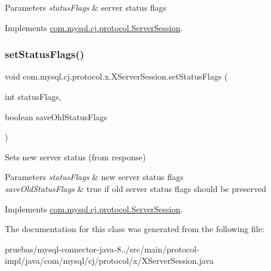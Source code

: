 \begin{DoxyParams}{Parameters}
{\em status\+Flags} & server status flags \\
\hline
\end{DoxyParams}


Implements \mbox{\hyperlink{interfacecom_1_1mysql_1_1cj_1_1protocol_1_1_server_session_a855cbd715a8c33299d062a72fd75d8f4}{com.\+mysql.\+cj.\+protocol.\+Server\+Session}}.

\mbox{\label{classcom_1_1mysql_1_1cj_1_1protocol_1_1x_1_1_x_server_session_a6b21c9c5c8446643ae85e58c3fe97af8}} 
\subsubsection{\texorpdfstring{set\+Status\+Flags()}{setStatusFlags()}\hspace{0.1cm}{\footnotesize\ttfamily [2/2]}}
{\footnotesize\ttfamily void com.\+mysql.\+cj.\+protocol.\+x.\+X\+Server\+Session.\+set\+Status\+Flags (\begin{DoxyParamCaption}\item[{int}]{status\+Flags,  }\item[{boolean}]{save\+Old\+Status\+Flags }\end{DoxyParamCaption})}

Sets new server status (from response)


\begin{DoxyParams}{Parameters}
{\em status\+Flags} & new server status flags \\
\hline
{\em save\+Old\+Status\+Flags} & true if old server status flags should be preserved \\
\hline
\end{DoxyParams}


Implements \mbox{\hyperlink{interfacecom_1_1mysql_1_1cj_1_1protocol_1_1_server_session_acf86f0ae9cdfd88f758ec42bb72bf127}{com.\+mysql.\+cj.\+protocol.\+Server\+Session}}.



The documentation for this class was generated from the following file\+:\begin{DoxyCompactItemize}
\item 
pruebas/mysql-\/connector-\/java-\/8../src/main/protocol-\/impl/java/com/mysql/cj/protocol/x/X\+Server\+Session.\+java\end{DoxyCompactItemize}
